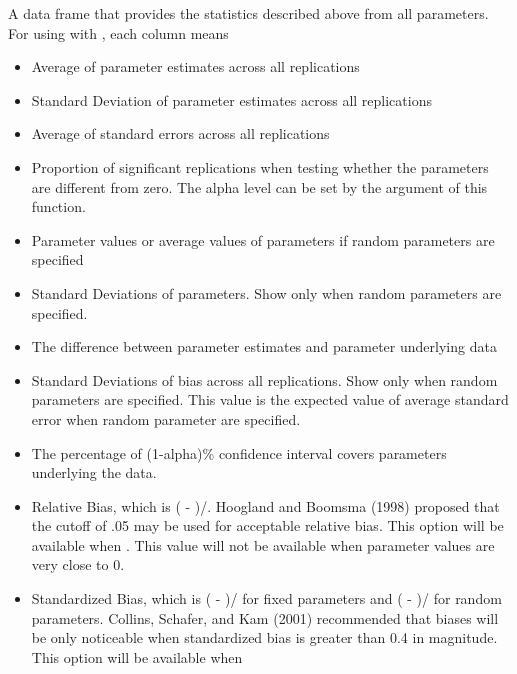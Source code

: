 \documentclass[a4paper]{book}
\begin{document}
\begin{Value}
A data frame that provides the statistics described above from all parameters.
For using with , each column means
\begin{itemize}

\item {} Average of parameter estimates across all replications
\item {} Standard Deviation of parameter estimates across all replications
\item {} Average of standard errors across all replications
\item {} Proportion of significant replications when testing whether the parameters are different from zero. The alpha level can be set by the  argument of this function.
\item {} Parameter values or average values of parameters if random parameters are specified
\item {} Standard Deviations of parameters. Show only when random parameters are specified.
\item {} The difference between parameter estimates and parameter underlying data
\item {} Standard Deviations of bias across all replications. Show only when random parameters are specified. 
This value is the expected value of average standard error when random parameter are specified.
\item {} The percentage of (1-alpha)\% confidence interval covers parameters underlying the data.
\item {} Relative Bias, which is ( - )/. 
Hoogland and Boomsma (1998) proposed that the cutoff of .05 may be used for acceptable relative bias.
This option will be available when . This value will not be available when parameter values are very close to 0.
\item {} Standardized Bias, which is ( - )/ 
for fixed parameters and ( - )/ 
for random parameters. Collins, Schafer, and Kam (2001) recommended that biases will be 
only noticeable when standardized bias is greater than 0.4 in magnitude.
This option will be available when 

\end{itemize}
\end{Value}
\end{document}
